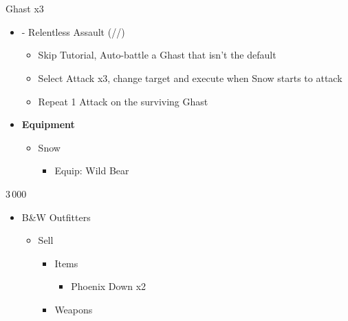 \chapter[Chapter 3]{}

\renewcommand{\first}{[1] - Relentless Assault (\com/\rav/\rav)}
\begin{multicols}{2}

	\begin{battle}[0:11]{Ghast x3}
		\begin{itemize}
			\item \first
			      \begin{itemize}
				      \item Skip Tutorial, Auto-battle a Ghast that isn't the default
				      \item Select Attack x3, change target and execute when Snow starts to attack
				      \item Repeat 1 Attack on the surviving Ghast
			      \end{itemize}
		\end{itemize}
	\end{battle}
	\begin{menu}
		\begin{itemize}
			\item \textbf{Equipment}
			      \begin{itemize}
				      \item Snow
				            \begin{itemize}
					            \item Equip: Wild Bear
				            \end{itemize}
			      \end{itemize}
		\end{itemize}
	\end{menu}
	\begin{shop}{3\,000}
		\begin{itemize}
			\item B\&W Outfitters
			      \begin{itemize}
				      \item Sell
				            \begin{itemize}
					            \item Items
					                  \begin{itemize}
						                  \item Phoenix Down x2
					                  \end{itemize}
					            \item Weapons

\end{itemize}
\end{itemize}
\end{itemize}
\end{shop}
\end{multicols}
